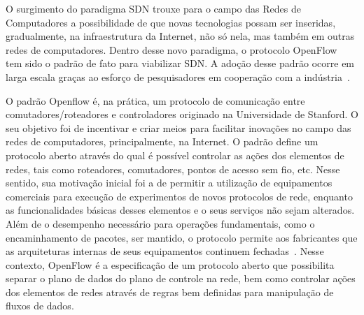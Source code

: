 \documentclass[	12pt, Times, openright, twoside, a4paper, english, brazil]{abntex2}
\begin{document}
O surgimento do paradigma SDN trouxe para o campo das Redes de Computadores a possibilidade de que novas tecnologias possam ser inseridas, gradualmente, na infraestrutura da Internet, não só nela, mas também em outras redes de computadores. Dentro desse novo paradigma, o protocolo OpenFlow~\cite{McKeown} tem sido o padrão de fato para viabilizar SDN. A adoção desse padrão ocorre em larga escala graças ao esforço de pesquisadores em cooperação com a indústria~\cite{ofn2012software}.


O padrão Openflow é, na prática, um protocolo de comunicação entre comutadores/roteadores e controladores originado na Universidade de Stanford. O seu objetivo foi de incentivar e criar meios para facilitar inovações no campo das redes de computadores, principalmente, na Internet. O padrão define um protocolo aberto através do qual é possível controlar as ações dos elementos de redes, tais como roteadores, comutadores, pontos de acesso sem fio, etc. Nesse sentido, sua motivação inicial foi a de permitir a utilização de equipamentos comerciais para execução de experimentos de novos protocolos de rede, enquanto as funcionalidades básicas desses elementos e o seus serviços não sejam alterados. Além de o desempenho necessário para operações fundamentais, como o encaminhamento de pacotes, ser mantido, o protocolo  permite aos fabricantes que as arquiteturas internas de seus equipamentos continuem fechadas~\cite{guedes2012}. Nesse contexto, OpenFlow é a especificação de um protocolo aberto que possibilita separar o plano de dados do plano de controle na rede, bem como controlar ações dos elementos de redes através de regras bem definidas para manipulação de fluxos de dados.
\end{document}
